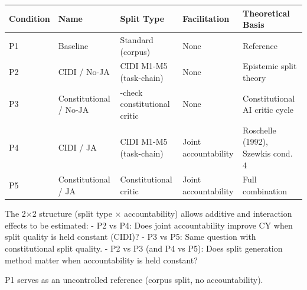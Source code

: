 \documentclass[
  11pt,
]{article}
\newcounter{none} %
\begin{document}
{\def\LTcaptype{none} %
\begin{longtable}[]{@{}
  >{\raggedright\arraybackslash}p{}
  >{\raggedright\arraybackslash}p{}
  >{\raggedright\arraybackslash}p{}
  >{\raggedright\arraybackslash}p{}
  >{\raggedright\arraybackslash}p{}@{}}
\toprule\noalign{}
\begin{minipage}[b]{\linewidth}\raggedright
Condition
\end{minipage} & \begin{minipage}[b]{\linewidth}\raggedright
Name
\end{minipage} & \begin{minipage}[b]{\linewidth}\raggedright
Split Type
\end{minipage} & \begin{minipage}[b]{\linewidth}\raggedright
Facilitation
\end{minipage} & \begin{minipage}[b]{\linewidth}\raggedright
Theoretical Basis
\end{minipage} \\
\midrule\noalign{}
\endhead
\bottomrule\noalign{}
\endlastfoot
P1 & Baseline & Standard (corpus) & None & Reference \\
P2 & CIDI / No-JA & CIDI M1-M5 (task-chain) & None & Epistemic split
theory \\
P3 & Constitutional / No-JA & 36-check constitutional critic & None &
Constitutional AI critic cycle \\
P4 & CIDI / JA & CIDI M1-M5 (task-chain) & Joint accountability &
Roschelle (1992), Szewkis cond. 4 \\
P5 & Constitutional / JA & Constitutional critic & Joint accountability
& Full combination \\
\end{longtable}
}

The 2$\times$2 structure (split type $\times$ accountability) allows additive and
interaction effects to be estimated: - P2 vs P4: Does joint
accountability improve CY when split quality is held constant (CIDI)? -
P3 vs P5: Same question with constitutional split quality. - P2 vs P3
(and P4 vs P5): Does split generation method matter when accountability
is held constant?

P1 serves as an uncontrolled reference (corpus split, no
accountability).
\end{document}
